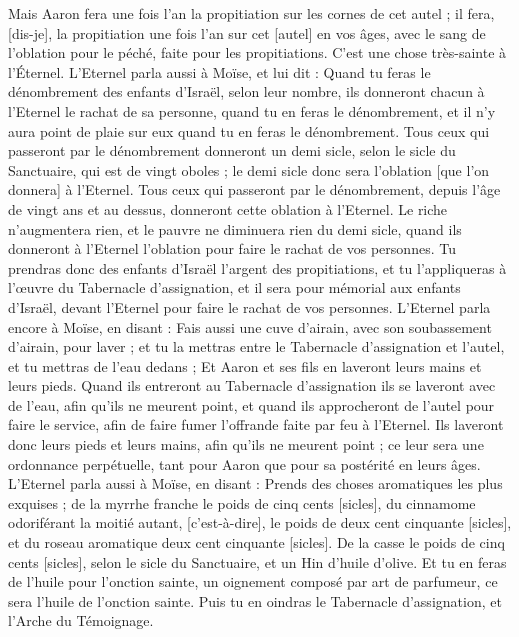 \begin{multicols}{2}
Mais Aaron fera une fois l'an la propitiation sur les cornes de cet autel ; il fera, [dis-je], la propitiation une fois l'an sur cet [autel] en vos âges, avec le sang de l'oblation pour le péché, faite pour les propitiations. C'est une chose très-sainte à l'Éternel.
L'Eternel parla aussi à Moïse, et lui dit :
Quand tu feras le dénombrement des enfants d'Israël, selon leur nombre, ils donneront chacun à l'Eternel le rachat de sa personne, quand tu en feras le dénombrement, et il n'y aura point de plaie sur eux quand tu en feras le dénombrement.
Tous ceux qui passeront par le dénombrement donneront un demi sicle, selon le sicle du Sanctuaire, qui est de vingt oboles ; le demi sicle donc sera l'oblation [que l'on donnera] à l'Eternel.
Tous ceux qui passeront par le dénombrement, depuis l'âge de vingt ans et au dessus, donneront cette oblation à l'Eternel.
Le riche n'augmentera rien, et le pauvre ne diminuera rien du demi sicle, quand ils donneront à l'Eternel l'oblation pour faire le rachat de vos personnes.
Tu prendras donc des enfants d'Israël l'argent des propitiations, et tu l'appliqueras à l'œuvre du Tabernacle d'assignation, et il sera pour mémorial aux enfants d'Israël, devant l'Eternel pour faire le rachat de vos personnes.
L'Eternel parla encore à Moïse, en disant :
Fais aussi une cuve d'airain, avec son soubassement d'airain, pour laver ; et tu la mettras entre le Tabernacle d'assignation et l'autel, et tu mettras de l'eau dedans ;
Et Aaron et ses fils en laveront leurs mains et leurs pieds.
Quand ils entreront au Tabernacle d'assignation ils se laveront avec de l'eau, afin qu'ils ne meurent point, et quand ils approcheront de l'autel pour faire le service, afin de faire fumer l'offrande faite par feu à l'Eternel.
Ils laveront donc leurs pieds et leurs mains, afin qu'ils ne meurent point ; ce leur sera une ordonnance perpétuelle, tant pour Aaron que pour sa postérité en leurs âges.
L'Eternel parla aussi à Moïse, en disant :
Prends des choses aromatiques les plus exquises ; de la myrrhe franche le poids de cinq cents [sicles], du cinnamome odoriférant la moitié autant, [c'est-à-dire], le poids de deux cent cinquante [sicles], et du roseau aromatique deux cent cinquante [sicles].
De la casse le poids de cinq cents [sicles], selon le sicle du Sanctuaire, et un Hin d'huile d'olive.
Et tu en feras de l'huile pour l'onction sainte, un oignement composé par art de parfumeur, ce sera l'huile de l'onction sainte.
Puis tu en oindras le Tabernacle d'assignation, et l'Arche du Témoignage.

\end{multicols}
